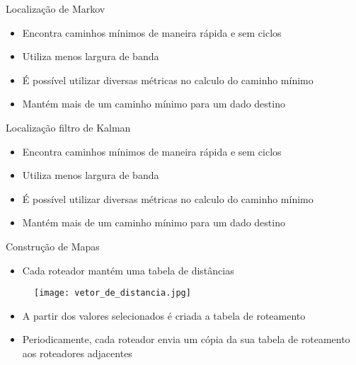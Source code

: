 \documentclass{beamer}
\newlength{\wideitemsep}
\let\olditem\item
\renewcommand{\item}{\setlength{\itemsep}{\wideitemsep}\olditem}
\begin{document}
\begin{frame}{Localização de Markov}
\begin{itemize}
 \item Encontra caminhos mínimos de maneira rápida e sem ciclos %
 \item Utiliza menos largura de banda %
 \item É possível utilizar diversas métricas no calculo do caminho mínimo %
 \item Mantém mais de um caminho mínimo para um dado destino %
\end{itemize}
\end{frame}

\begin{frame}{Localização filtro de Kalman}
\begin{itemize}
 \item Encontra caminhos mínimos de maneira rápida e sem ciclos %
 \item Utiliza menos largura de banda %
 \item É possível utilizar diversas métricas no calculo do caminho mínimo %
 \item Mantém mais de um caminho mínimo para um dado destino %
\end{itemize}
\end{frame}

\begin{frame}{Construção de Mapas}
\begin{itemize}
 \item Cada roteador mantém uma tabela de distâncias %
\end{itemize}
\begin{figure}[!htb]
\centering
\texttt{[image: vetor\_de\_distancia.jpg]}
\end{figure}
\begin{itemize}
 \item A partir dos valores selecionados é criada a tabela de roteamento
 \item Periodicamente, cada roteador envia um cópia da sua tabela de roteamento aos roteadores adjacentes %
\end{itemize}
\end{frame}
\end{document}
